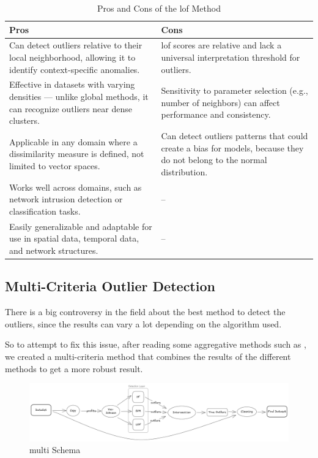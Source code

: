 \documentclass[11pt,english,a4paper,hidelinks]{book}
\begin{document}
\begin{table}[H]
    \centering
    \begin{tabular}{|p{7cm}|p{7cm}|}
    \hline
    \textbf{Pros} & \textbf{Cons} \\
    \hline
    Can detect outliers relative to their local neighborhood, allowing it to identify context-specific anomalies. & \acrshort{lof} scores are relative and lack a universal interpretation threshold for outliers. \\
    \hline
    Effective in datasets with varying densities — unlike global methods, it can recognize outliers near dense clusters. & Sensitivity to parameter selection (e.g., number of neighbors) can affect performance and consistency. \\
    \hline
    Applicable in any domain where a dissimilarity measure is defined, not limited to vector spaces. & Can detect outliers patterns that could create a bias for models, because they do not belong to the normal distribution. \\
    \hline
    Works well across domains, such as network intrusion detection or classification tasks. & -- \\
    \hline
    Easily generalizable and adaptable for use in spatial data, temporal data, and network structures. & -- \\
    \hline
    \end{tabular}
    \caption{Pros and Cons of the \acrshort{lof} Method}
\end{table}
    
\subsection{Multi-Criteria Outlier Detection}

There is a big controversy in the field about the best method to detect the outliers, since the results can vary a lot depending on the algorithm used.

\vspace{0.5cm}
\noindent So to attempt to fix this issue, after reading some aggregative methods such as \textcite{abro2020stacking}, we created a multi-criteria method that combines the results of the different methods to get a more robust result.

\begin{figure}[H]
    \centering
    \includegraphics[width=1\textwidth]{images/code/outliers/multimodal.png}
    \caption{\acrshort{multi} Schema}
    \label{fig:multimodal}
\end{figure}
\end{document}
